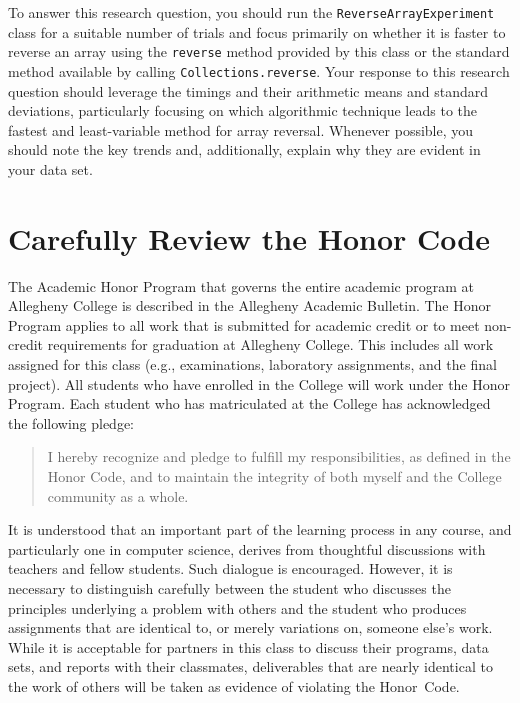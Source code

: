  To answer this research question, you should run the {\tt ReverseArrayExperiment} class for a suitable number
of trials and focus primarily on whether it is faster to reverse an array using the {\tt reverse} method provided by
this class or the standard method available by calling {\tt Collections.reverse}.  Your response to this research
question should leverage the timings and their arithmetic means and standard deviations, particularly focusing on which
algorithmic technique leads to the fastest and least-variable method for array reversal. Whenever possible, you should
note the key trends and, additionally, explain why they are evident in your data set.

\section*{Carefully Review the Honor Code}

The Academic Honor Program that governs the entire academic program at Allegheny College is described in the Allegheny
Academic Bulletin.  The Honor Program applies to all work that is submitted for academic credit or to meet non-credit
requirements for graduation at Allegheny College. This includes all work assigned for this class (e.g., examinations,
laboratory assignments, and the final project). All students who have enrolled in the College will work under the Honor
Program.  Each student who has matriculated at the College has acknowledged the following pledge:

\vspace*{-.1in}
\begin{quote}
  I hereby recognize and pledge to fulfill my responsibilities, as defined in the Honor Code, and to maintain the
  integrity of both myself and the College community as a whole.
\end{quote}
\vspace*{-.1in}

\noindent It is understood that an important part of the learning process in any course, and particularly one in
computer science, derives from thoughtful discussions with teachers and fellow students.  Such dialogue is encouraged.
However, it is necessary to distinguish carefully between the student who discusses the principles underlying a problem
with others and the student who produces assignments that are identical to, or merely variations on, someone else's
work. While it is acceptable for partners in this class to discuss their programs, data sets, and reports with their
classmates, deliverables that are nearly identical to the work of others will be taken as evidence of violating the
\mbox{Honor Code}.

